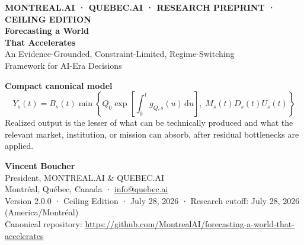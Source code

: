 \documentclass[11pt,letterpaper]{article}
\newcommand{\dd}{\,\mathrm{d}}
\begin{document}
\begin{titlepage}
\pagecolor{FWIvory}
\vspace*{0.22in}
{\sffamily\small\bfseries\color{FWGold}\MakeUppercase{MONTREAL.AI · QUEBEC.AI · Research Preprint · Ceiling Edition}}\\[0.48in]
{\sffamily\bfseries\fontsize{31}{34}\selectfont\color{white} Forecasting a World\\[0.10in]That Accelerates}\\[0.25in]
{\sffamily\fontsize{14}{18}\selectfont\color{white!88} An Evidence-Grounded, Constraint-Limited, Regime-Switching\\Framework for AI-Era Decisions}

\vspace{1.12in}
\begin{keybox}
\centering
{\large\bfseries\color{FWNavy} Compact canonical model}\vspace{0.35em}
\begin{equation*}
\boxed{
Y_s(t)=B_s(t)\min\!\left\{
Q_0\exp\!\left[\int_0^t g_{Q,s}(u)\dd u\right],
\;M_s(t)D_s(t)U_s(t)
\right\}}
\end{equation*}
\small Realized output is the lesser of what can be technically produced and what the relevant market, institution, or mission can absorb, after residual bottlenecks are applied.
\end{keybox}

\vfill
{\sffamily\large\bfseries Vincent Boucher}\\
{\sffamily President, MONTREAL.AI \& QUEBEC.AI}\\[0.35em]
{\sffamily\small Montréal, Québec, Canada · \href{mailto:info@quebec.ai}{info@quebec.ai}}\\[0.9em]
{\sffamily\small Version 2.0.0 · Ceiling Edition · July 28, 2026 · Research cutoff: July 28, 2026 (America/Montréal)}\\[0.25em]
{\sffamily\footnotesize Canonical repository: \url{https://github.com/MontrealAI/forecasting-a-world-that-accelerates}}
\vspace{0.55in}
\end{titlepage}
\nopagecolor
\end{document}
